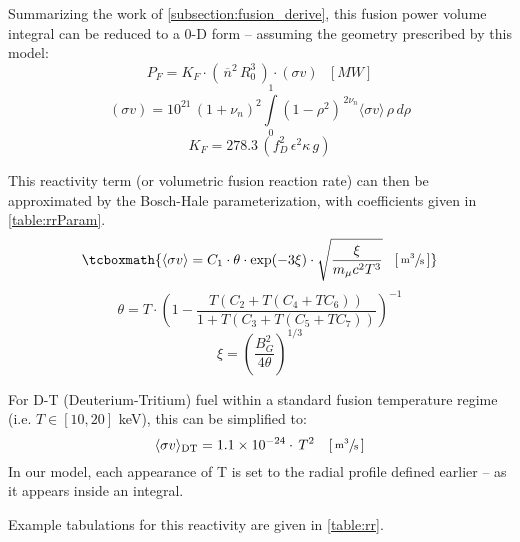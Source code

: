 Summarizing the work of \cref{subsection:fusion_derive}, this fusion power volume integral can be reduced to a 0-D form -- assuming the geometry prescribed by this model:
\begin{equation}
	P_F = K_F \cdot ( \, \overline{n}^2 \, R_0^3 \, ) \cdot (\sigma v) \ \ \ [MW]
\end{equation}
\begin{equation}
	 (\sigma v) = 10^{21} \, (1+\nu_n)^2 \int\limits_0^1 ( 1 - \rho^2 ) ^ { \, 2 \nu_n} \langle \sigma v \rangle \, \rho \, d\rho
\end{equation}
\begin{equation}
	K_F = 278.3 \, ( f_D^2 \, \epsilon^2 \kappa \, g )
\end{equation}

This reactivity term (or volumetric fusion reaction rate) can then be approximated by the Bosch-Hale parameterization, with coefficients given in \cref{table:rrParam}.\cite{boschhale,zach}
\begin{equation}
	\tcboxmath{
	\langle \sigma v \rangle = C_1 \cdot \theta \cdot \textnormal{exp}(-3 \xi) \cdot \sqrt{ \frac{\xi  }{m_\mu  c^2 T^3} }  \ \ \, [ \, \sfrac{ \textnormal{m}^3 }{ \textnormal{s} } \, ] }
\end{equation}
\begin{equation}
	\theta = T \cdot \left(1-\frac{T(C_2+T(C_4+TC_6))}{1+T(C_3+T(C_5+TC_7))}\right) ^{-1}
\end{equation}
\begin{equation}
	\xi = \left(\frac{B_G^2}{4\theta}\right)^{1/3}
\end{equation}

For D-T (Deuterium-Tritium) fuel within a standard fusion temperature regime (i.e. $T \in [10, 20]$ keV), this can be simplified to:\cite{zach}
\begin{equation}
		\langle\sigma v\rangle_\mathrm{DT} = 1.1\times10^{-24} \cdot  \, T^2   \ \ \ [ \, \sfrac{ \textnormal{m}^3 }{ \textnormal{s} } \, ]
\end{equation}
In our model, each appearance of T is set to the radial profile defined earlier -- as it appears inside an integral.

Example tabulations for this reactivity are given in \cref{table:rr}.\cite{zach,nrl,boschhale}

